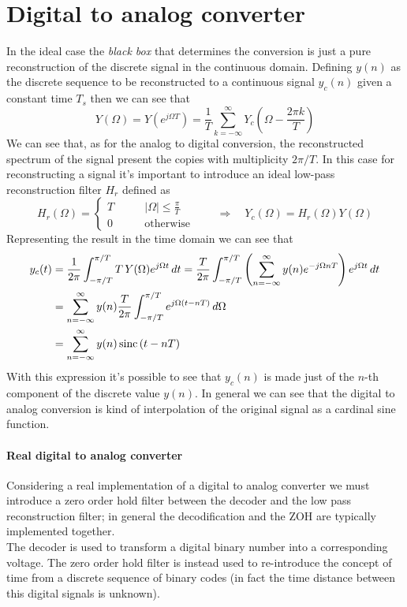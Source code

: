 \section{Digital to analog converter}
	In the ideal case the \textit{black box} that determines the conversion is just a pure reconstruction of the discrete signal in the continuous domain. Defining $y(n)$ as the discrete sequence to be reconstructed to a continuous signal $y_c(n)$ given a constant time $T_s$ then we can see that
	\[ Y(\Omega) = Y(e^{j\Omega T}) = \frac 1 T \sum_{k=-\infty}^\infty Y_c\left(\Omega - \frac{2\pi k}{T}\right) \]
	We can see that, as for the analog to digital conversion, the reconstructed spectrum of the signal present the copies with multiplicity $2\pi/T$. In this case for reconstructing a signal it's important to introduce an ideal low-pass reconstruction filter $H_r$ defined as
	\[ H_r(\Omega) = \begin{cases}
		T \qquad & |\Omega|\leq \frac \pi T \\ 0 & \textrm{otherwise}
	\end{cases} \qquad \Rightarrow \quad Y_c(\Omega) = H_r(\Omega) Y(\Omega) \]
	Representing the result in the time domain we can see that
	\begin{equation}
	\begin{split}
		y_c(t) & = \frac 1 {2\pi} \int_{-\pi/T}^{\pi/T} T \, Y(\Omega) e^{j\Omega t}\, dt = \frac T{2\pi}  \int_{-\pi/T}^{\pi/T} \left(\sum_{n=-\infty}^\infty y(n) e^{-j\Omega nT} \right) e^{j\Omega t}\, dt \\ & = \sum_{n=-\infty}^\infty y(n) \frac T{2\pi} \int_{-\pi/T}^{\pi/T} e^{j\Omega(t-nT)}\, d\Omega \\
		& = \sum_{n=-\infty}^\infty y(n) \, \textrm{sinc}\left( t - nT \right)
	\end{split}
	\end{equation}
	With this expression it's possible to see that $y_c(n)$ is made just of the $n$-th component of the discrete value $y(n)$. In general we can see that the digital to analog conversion is kind of interpolation of the original signal as a cardinal sine function.
		
	\paragraph{Real digital to analog converter} Considering a real implementation of a digital to analog converter we must introduce a zero order hold filter between the decoder and the low pass reconstruction filter; in general the decodification and the ZOH are typically implemented together. \\
	The decoder is used to transform a digital binary number into a corresponding voltage. The zero order hold filter is instead used to re-introduce the concept of time from a discrete sequence of binary codes (in fact the time distance between this digital signals is unknown).
		
